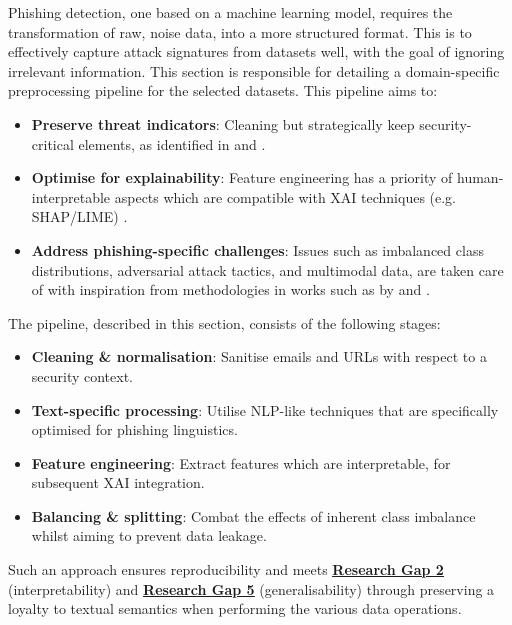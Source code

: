 
Phishing detection, one based on a machine learning model, requires the transformation of raw, noise data, into a more structured format. This is to effectively capture attack signatures from datasets well, with the goal of ignoring irrelevant information. This section is responsible for detailing a domain-specific preprocessing pipeline for the selected datasets. This pipeline aims to:

\begin{itemize}
  \item \textbf{Preserve threat indicators}: Cleaning but strategically keep security-critical elements, as identified in \cite{greco2023explaining} and \cite{lin2021phishpedia}.
  \item \textbf{Optimise for explainability}: Feature engineering has a priority of human-interpretable aspects which are compatible with XAI techniques (e.g. SHAP/LIME) \citep{shendkar2024enhancing}.
  \item \textbf{Address phishing-specific challenges}: Issues such as imbalanced class distributions, adversarial attack tactics, and multimodal data, are taken care of with inspiration from methodologies in works such as by \cite{zamir2020phishing} and \cite{ahmad2024across}.
\end{itemize}

\noindent The pipeline, described in this section, consists of the following stages:

\begin{itemize}
  \item \textbf{Cleaning \& normalisation}: Sanitise emails and URLs with respect to a security context.
  \item \textbf{Text-specific processing}: Utilise NLP-like techniques that are specifically optimised for phishing linguistics.
  \item \textbf{Feature engineering}: Extract features which are interpretable, for subsequent XAI integration.
  \item \textbf{Balancing \& splitting}: Combat the effects of inherent class imbalance whilst aiming to prevent data leakage.
\end{itemize}

\noindent Such an approach ensures reproducibility and meets \hyperref[research-gap-5]{\uline{\textbf{Research Gap 2}}} (interpretability) and \hyperref[research-gap-5]{\uline{\textbf{Research Gap 5}}} (generalisability) through preserving a loyalty to textual semantics when performing the various data operations.
